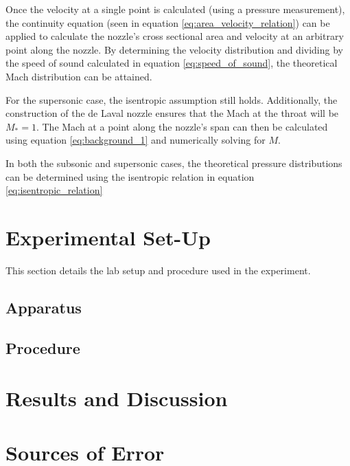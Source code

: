 \documentclass[runningheads]{llncs}
\begin{document}
\noindent
Once the velocity at a single point is calculated (using a pressure measurement), the continuity equation (seen in equation \ref{eq:area_velocity_relation}) can be applied to calculate the nozzle's cross sectional area and velocity at an arbitrary point along the nozzle. By determining the velocity distribution and dividing by the speed of sound calculated in equation \ref{eq:speed_of_sound}, the theoretical Mach distribution can be attained.

\noindent
For the supersonic case, the isentropic assumption still holds. Additionally, the construction of the de Laval nozzle ensures that the Mach at the throat will be $M_*=1$. The Mach at a point along the nozzle's span can then be calculated using equation \ref{eq:background_1} and numerically solving for $M$.\newline

\noindent
In both the subsonic and supersonic cases, the theoretical pressure distributions can be determined using the isentropic relation in equation \ref{eq:isentropic_relation}




\section{Experimental Set-Up}

\noindent
This section details the lab setup and procedure used in the experiment.

\subsection{Apparatus}

\subsection{Procedure}\label{sec:procedure}




\section{Results and Discussion}




\section{Sources of Error}\label{sec:source_of_error}
\end{document}
